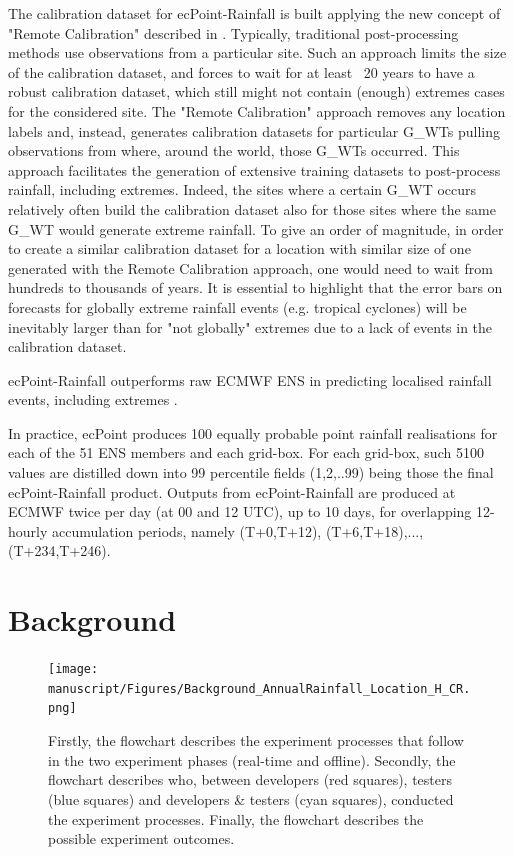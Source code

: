 \documentclass[twocol]{ametsocV5} %
\begin{document}
The calibration dataset for ecPoint-Rainfall is built applying the new concept of "Remote Calibration" described in \citet{Hewson2020a}. Typically, traditional post-processing methods use observations from a particular site. Such an approach limits the size of the calibration dataset, and forces to wait for at least ~20 years to have a robust calibration dataset, which still might not contain (enough) extremes cases for the considered site. The "Remote Calibration" approach removes any location labels and, instead, generates calibration datasets for particular G\_WTs pulling observations from where, around the world, those G\_WTs occurred. This approach facilitates the generation of extensive training datasets to post-process rainfall, including extremes. Indeed, the sites where a certain G\_WT occurs relatively often build the calibration dataset also for those sites where the same G\_WT would generate extreme rainfall. To give an order of magnitude, in order to create a similar calibration dataset for a location with similar size of one generated with the Remote Calibration approach, one would need to wait from hundreds to thousands of years. It is essential to highlight that the error bars on forecasts for globally extreme rainfall events (e.g. tropical cyclones) will be inevitably larger than for "not globally" extremes due to a lack of events in the calibration dataset. \par
 ecPoint-Rainfall outperforms raw ECMWF ENS in predicting localised rainfall events, including extremes \citet{Hewson2020a}. \par
In practice, ecPoint produces 100 equally probable point rainfall realisations for each of the 51 ENS members and each grid-box. For each grid-box, such 5100 values are distilled down into 99 percentile fields (1,2,..99) being those the final ecPoint-Rainfall product. Outputs from ecPoint-Rainfall are produced at ECMWF twice per day (at 00 and 12 UTC), up to 10 days, for overlapping 12-hourly accumulation periods, namely (T+0,T+12), (T+6,T+18),...,(T+234,T+246).


\section{Background}
\begin{figure}
\centerline{\texttt{[image: manuscript/Figures/Background\_AnnualRainfall\_Location\_H\_CR.png]}}
\caption{Firstly, the flowchart describes the experiment processes that follow in the two experiment phases (real-time and offline). Secondly, the flowchart describes who, between developers (red squares), testers (blue squares) and developers & testers (cyan squares), conducted the experiment processes. Finally, the flowchart describes the possible experiment outcomes.}
\label{Location_Annual_Rainfall_H_CR}
\end{figure}
\end{document}
